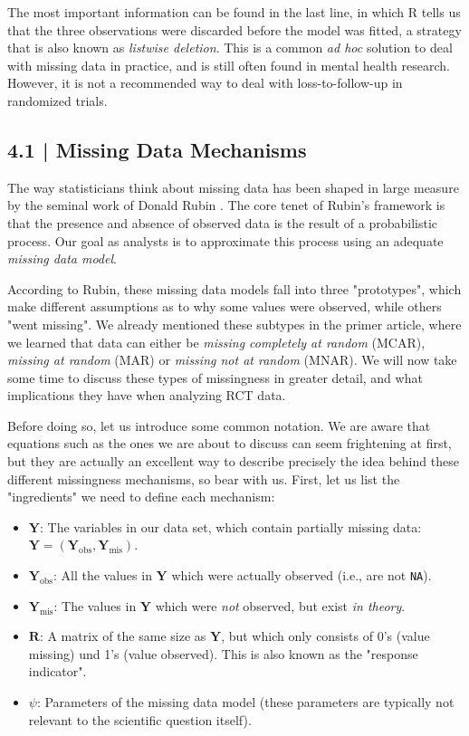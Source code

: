 The most important information can be found in the last line, in which \textsf{R} tells us that the three observations were discarded before the model was fitted, a strategy that is also known as \emph{listwise deletion}. This is a common \emph{ad hoc} solution to deal with missing data in practice, and is still often found in mental health research. However, it is not a recommended way to deal with loss-to-follow-up in randomized trials.

\subsection{{\normalfont\textsf{\textcolor{sBlue}{\small 4.1 |}}} Missing Data Mechanisms}

The way statisticians think about missing data has been shaped in large measure by the seminal work of Donald Rubin \citep[][chapter 2.4.4]{rubin1976inference, fimd}. The core tenet of Rubin's framework is that the presence and absence of observed data is the result of a probabilistic process. Our goal as analysts is to approximate this process using an adequate \emph{missing data model}. 

According to Rubin, these missing data models fall into three "prototypes", which make different assumptions as to why some values were observed, while others "went missing". We already mentioned these subtypes in the primer article, where we learned that data can either be \emph{missing completely at random} (MCAR), \emph{missing at random} (MAR) or \emph{missing not at random} (MNAR). We will now take some time to discuss these types of missingness in greater detail, and what implications they have when analyzing RCT data.

Before doing so, let us introduce some common notation. We are aware that equations such as the ones we are about to discuss can seem frightening at first, but they are actually an excellent way to describe precisely the idea behind these different missingness mechanisms, so bear with us. First, let us list the "ingredients" we need to define each mechanism:

\begin{itemize}
\item $\mathbf{Y}$: The variables in our data set, which contain partially missing data: $\mathbf{Y} = (\mathbf{Y}_{\text{obs}}, \mathbf{Y}_{\text{mis}})$.
\item $\mathbf{Y}_{\text{obs}}$: All the values in  $\mathbf{Y}$ which were actually observed (i.e., are not \texttt{NA}).
\item $\mathbf{Y}_{\text{mis}}$: The values in $\mathbf{Y}$ which were \emph{not} observed, but exist \emph{in theory}.
\item $\mathbf{R}$: A matrix of the same size as $\mathbf{Y}$, but which only consists of 0's (value missing) und 1's (value observed). This is also known as the "response indicator".
\item $\psi$: Parameters of the missing data model (these parameters are typically not relevant to the scientific question itself).
\end{itemize}

